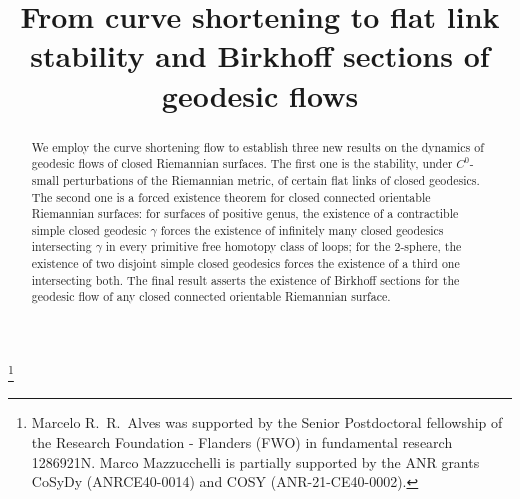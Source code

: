 \documentclass[JEP,XML,SOM,Unicode,NoFloatCountersInSection,published]{cedram}
\theoremstyle{plain}
\theoremstyle{definition}
\begin{document}
\frontmatter

\title[From curve shortening to link stability and Birkhoff sections]{From curve shortening to flat link stability and Birkhoff sections of geodesic flows}

\author[\initial{M.} \middlename{R. R.} \lastname{Alves}]{  }
\address{Department of Mathematics, University of Antwerp,\\
Middelheim G, M.G.105, Middelheimlaan 1, 2020 Antwerp, Belgium}

\author[\initial{M.} \lastname{Mazzucchelli}]{ }
\address{CNRS, UMPA, \'Ecole Normale Sup\'erieure de Lyon,\\
46 all\'ee d'Italie, 69364 Lyon, France}

\thanks{Marcelo R.~R.~Alves was supported by the Senior Postdoctoral fellowship of the Research Foundation - Flanders (FWO) in fundamental research 1286921N. Marco Mazzucchelli is partially supported by the ANR grants CoSyDy (ANRCE40-0014) and COSY (ANR-21-CE40-0002).}

\begin{abstract}
We employ the curve shortening flow to establish three new results on the dynamics of geodesic flows of closed Riemannian surfaces. The first one is the stability, under $C^0$-small perturbations of the Riemannian metric, of certain flat links of closed geodesics. The second one is a forced existence theorem for closed connected orientable Riemannian surfaces: for surfaces of positive genus, the existence of a contractible simple closed geodesic $\gamma$ forces the existence of infinitely many closed geodesics intersecting $\gamma$ in every primitive free homotopy class of loops; for the $2$-sphere, the existence of two disjoint simple closed geodesics forces the existence of a third one intersecting both. The final result asserts the existence of Birkhoff sections for the geodesic flow of any closed connected orientable Riemannian surface.
\end{abstract}



\end{document}
